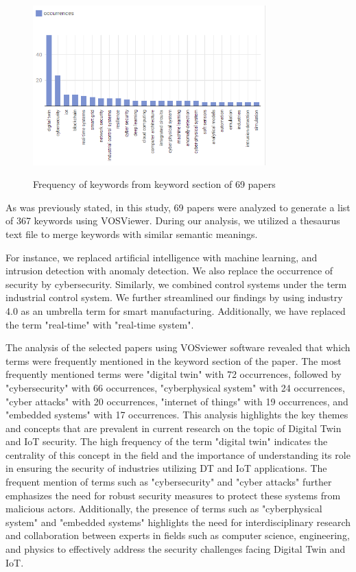 \begin{figure}[H]
    \caption{Frequency of keywords from keyword section of 69 papers}
    \includegraphics[width=0.8\textwidth]{images/newimages/vosviewer-keyword-occurance-vertical.png}
    \label{fig:alluvial-key}
\end{figure}
As was previously stated, in this study, 69 papers were analyzed to generate a list of 367 keywords using VOSViewer. During our analysis, we utilized a thesaurus text file to merge keywords with similar semantic meanings.

For instance, we replaced artificial intelligence with machine learning, and intrusion detection with anomaly detection. We also replace the occurrence of security by cybersecurity. Similarly, we combined control systems under the term industrial control system. We further streamlined our findings by using industry 4.0 as an umbrella term for smart manufacturing. Additionally, we have replaced the term "real-time" with "real-time system". 


The analysis of the selected papers using VOSviewer software revealed that which terms were frequently mentioned in the keyword section of the paper. The most frequently mentioned terms were "digital twin" with 72 occurrences, followed by "cybersecurity" with 66 occurrences, "cyberphysical system" with 24 occurrences, "cyber attacks" with 20 occurrences, "internet of things" with 19 occurrences, and "embedded systems" with 17 occurrences. This analysis highlights the key themes and concepts that are prevalent in current research on the topic of Digital Twin and IoT security. The high frequency of the term "digital twin" indicates the centrality of this concept in the field and the importance of understanding its role in ensuring the security of industries utilizing DT and IoT applications. The frequent mention of terms such as "cybersecurity" and "cyber attacks" further emphasizes the need for robust security measures to protect these systems from malicious actors. Additionally, the presence of terms such as "cyberphysical system" and "embedded systems" highlights the need for interdisciplinary research and collaboration between experts in fields such as computer science, engineering, and physics to effectively address the security challenges facing Digital Twin and IoT.

